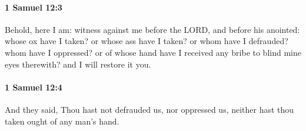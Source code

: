 		\paragraph{1 Samuel 12:3} %
			\label{1SAMUEL-12-3}

			Behold, here I am: witness against me before the LORD, and before his anointed: whose ox have I taken? or whose ass have I taken? or whom have I defrauded? whom have I oppressed? or of whose hand have I received any bribe to blind mine eyes therewith? and I will restore it you.


		\paragraph{1 Samuel 12:4} %
			\label{1SAMUEL-12-4}

			And they said, Thou hast not defrauded us, nor oppressed us, neither hast thou taken ought of any man’s hand.

